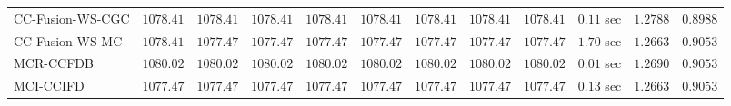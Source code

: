 \begin{table}[H]
\begin{tabular}{lrrrrrrrrrrr}
    CC-Fusion-WS-CGC & $      1078.41$ & $      1078.41$ & $      1078.41$ & $      1078.41$ & $      1078.41$ & $      1078.41$ & $      1078.41$ & $      1078.41$ & $         0.11$ sec    & $       1.2788$  & $       0.8988$ \\ 
     CC-Fusion-WS-MC & $      1078.41$ & $      1077.47$ & $      1077.47$ & $      1077.47$ & $      1077.47$ & $      1077.47$ & $      1077.47$ & $      1077.47$ & $         1.70$ sec    & $       1.2663$  & $       0.9053$ \\ 
\cmidrule{1-1} 
           MCR-CCFDB & $      1080.02$ & $      1080.02$ & $      1080.02$ & $      1080.02$ & $      1080.02$ & $      1080.02$ & $      1080.02$ & $      1080.02$ & $         0.01$ sec    & $       1.2690$  & $       0.9053$ \\ 
\cmidrule{1-1} 
           MCI-CCIFD & $      1077.47$ & $      1077.47$ & $      1077.47$ & $      1077.47$ & $      1077.47$ & $      1077.47$ & $      1077.47$ & $      1077.47$ & $         0.13$ sec    & $       1.2663$  & $       0.9053$ \\ 
\bottomrule
\end{tabular}
\end{table}


